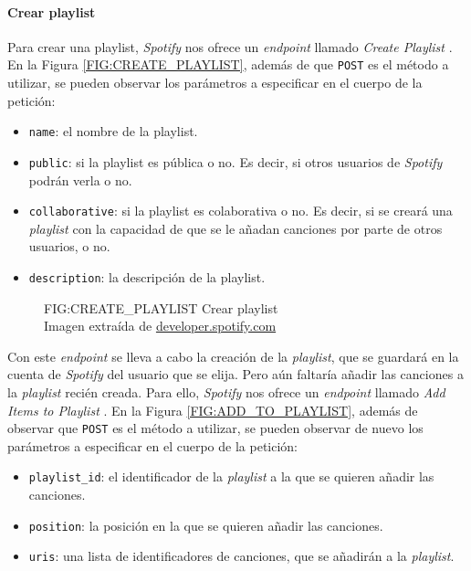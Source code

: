 \paragraph{Crear playlist\label{subsec:crear_playlist}}

Para crear una playlist, \textit{Spotify} nos ofrece un \textit{endpoint} llamado \textit{Create Playlist} \cite{create_playlist}. 
En la Figura \ref{FIG:CREATE_PLAYLIST}, además de que 
\texttt{POST} es el método a utilizar, se pueden observar los parámetros a especificar en el cuerpo de la petición:

\begin{itemize}
  \item \texttt{name}: el nombre de la playlist.
  \item \texttt{public}: si la playlist es pública o no. Es decir, si otros usuarios de \textit{Spotify} podrán verla o no.
  \item \texttt{collaborative}: si la playlist es colaborativa o no. Es decir, si se creará una \textit{playlist} con la capacidad
  de que se le añadan canciones por parte de otros usuarios, o no.
  \item \texttt{description}: la descripción de la playlist.
\end{itemize}

\begin{figure}[Crear playlist]{FIG:CREATE_PLAYLIST}
    {Crear playlist \\
    {\scriptsize Imagen extraída de \href{https://developer.spotify.com/documentation/web-api/reference/create-playlist}{developer.spotify.com}}}
\end{figure}

Con este \textit{endpoint} se lleva a cabo la creación de la \textit{playlist}, que se guardará en la cuenta de \textit{Spotify} del usuario que
se elija. Pero aún faltaría añadir las canciones a la \textit{playlist} recién creada. Para ello, \textit{Spotify} nos ofrece un \textit{endpoint} llamado
\textit{Add Items to Playlist} \cite{add_to_playlist}. En la Figura \ref{FIG:ADD_TO_PLAYLIST}, además de observar que \texttt{POST} es el método a utilizar,
se pueden observar de nuevo los parámetros a especificar en el cuerpo de la petición:

\begin{itemize}
  \item \texttt{playlist\_id}: el identificador de la \textit{playlist} a la que se quieren añadir las canciones.
  \item \texttt{position}: la posición en la que se quieren añadir las canciones.
  \item \texttt{uris}: una lista de identificadores de canciones, que se añadirán a la \textit{playlist}.
\end{itemize}

